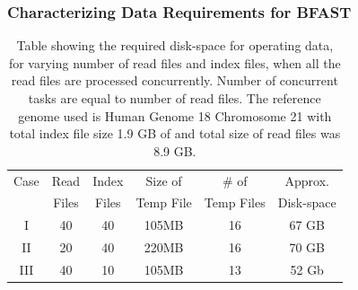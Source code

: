 \documentclass{cpeauth}
\begin{document}
\subsubsection{Characterizing Data Requirements for BFAST}




\begin{table}
 \begin{tabular}{|c|c|c|c|c|c|} 
 \hline 
Case &Read& Index& Size of&  \# of & Approx.  \\
 &Files &  Files  & Temp File & Temp Files & Disk-space\\
 \hline
I&40 & 40 &105MB & 16 &67 GB \\
II&20 & 40 & 220MB & 16 &70 GB \\
III&40 & 10 & 105MB & 13 &52 Gb \\ 
 \hline
 \end{tabular}

 \caption{Table showing the required disk-space for operating data,
   for varying number of read files and index files, when all the read
   files are processed concurrently.  Number of concurrent tasks are
   equal to number of read files. The reference genome used is Human
   Genome 18 Chromosome 21 with total index file size 1.9 GB of and
   total size of read files was 8.9 GB.}
    \label{table:dynamic-diskspace} 
\end{table}


\end{document}
